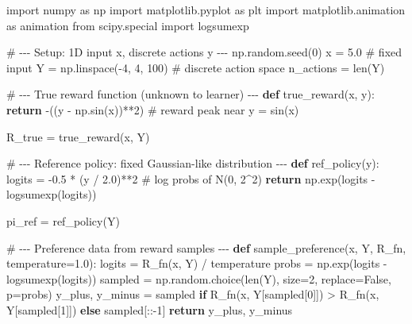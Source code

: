 \documentclass[
  letterpaper,
  numbers=noenddot,
  DIV=11]{scrreprt}
\newenvironment{Shaded}{\begin{snugshade}}{\end{snugshade}}
\newcommand{\BuiltInTok}[1]{\textcolor[rgb]{0.00,0.23,0.31}{#1}}
\newcommand{\CommentTok}[1]{\textcolor[rgb]{0.37,0.37,0.37}{#1}}
\newcommand{\ControlFlowTok}[1]{\textcolor[rgb]{0.00,0.23,0.31}{\textbf{#1}}}
\newcommand{\DecValTok}[1]{\textcolor[rgb]{0.68,0.00,0.00}{#1}}
\newcommand{\FloatTok}[1]{\textcolor[rgb]{0.68,0.00,0.00}{#1}}
\newcommand{\ImportTok}[1]{\textcolor[rgb]{0.00,0.46,0.62}{#1}}
\newcommand{\KeywordTok}[1]{\textcolor[rgb]{0.00,0.23,0.31}{\textbf{#1}}}
\newcommand{\NormalTok}[1]{\textcolor[rgb]{0.00,0.23,0.31}{#1}}
\newcommand{\OperatorTok}[1]{\textcolor[rgb]{0.37,0.37,0.37}{#1}}
\newcommand{\VariableTok}[1]{\textcolor[rgb]{0.07,0.07,0.07}{#1}}
\theoremstyle{plain}
\theoremstyle{definition}
\theoremstyle{remark}
\begin{document}
\begin{Shaded}
\begin{Highlighting}[numbers=left,,]
\ImportTok{import}\NormalTok{ numpy }\ImportTok{as}\NormalTok{ np}
\ImportTok{import}\NormalTok{ matplotlib.pyplot }\ImportTok{as}\NormalTok{ plt}
\ImportTok{import}\NormalTok{ matplotlib.animation }\ImportTok{as}\NormalTok{ animation}
\ImportTok{from}\NormalTok{ scipy.special }\ImportTok{import}\NormalTok{ logsumexp}

\CommentTok{\# {-}{-}{-} Setup: 1D input x, discrete actions y {-}{-}{-}}
\NormalTok{np.random.seed(}\DecValTok{0}\NormalTok{)}
\NormalTok{x }\OperatorTok{=} \FloatTok{5.0}  \CommentTok{\# fixed input}
\NormalTok{Y }\OperatorTok{=}\NormalTok{ np.linspace(}\OperatorTok{{-}}\DecValTok{4}\NormalTok{, }\DecValTok{4}\NormalTok{, }\DecValTok{100}\NormalTok{)  }\CommentTok{\# discrete action space}
\NormalTok{n\_actions }\OperatorTok{=} \BuiltInTok{len}\NormalTok{(Y)}

\CommentTok{\# {-}{-}{-} True reward function (unknown to learner) {-}{-}{-}}
\KeywordTok{def}\NormalTok{ true\_reward(x, y):}
    \ControlFlowTok{return} \OperatorTok{{-}}\NormalTok{((y }\OperatorTok{{-}}\NormalTok{ np.sin(x))}\OperatorTok{**}\DecValTok{2}\NormalTok{)  }\CommentTok{\# reward peak near y = sin(x)}

\NormalTok{R\_true }\OperatorTok{=}\NormalTok{ true\_reward(x, Y)}

\CommentTok{\# {-}{-}{-} Reference policy: fixed Gaussian{-}like distribution {-}{-}{-}}
\KeywordTok{def}\NormalTok{ ref\_policy(y):}
\NormalTok{    logits }\OperatorTok{=} \OperatorTok{{-}}\FloatTok{0.5} \OperatorTok{*}\NormalTok{ (y }\OperatorTok{/} \FloatTok{2.0}\NormalTok{)}\OperatorTok{**}\DecValTok{2}  \CommentTok{\# log probs of N(0, 2\^{}2)}
    \ControlFlowTok{return}\NormalTok{ np.exp(logits }\OperatorTok{{-}}\NormalTok{ logsumexp(logits))}

\NormalTok{pi\_ref }\OperatorTok{=}\NormalTok{ ref\_policy(Y)}

\CommentTok{\# {-}{-}{-} Preference data from reward samples {-}{-}{-}}
\KeywordTok{def}\NormalTok{ sample\_preference(x, Y, R\_fn, temperature}\OperatorTok{=}\FloatTok{1.0}\NormalTok{):}
\NormalTok{    logits }\OperatorTok{=}\NormalTok{ R\_fn(x, Y) }\OperatorTok{/}\NormalTok{ temperature}
\NormalTok{    probs }\OperatorTok{=}\NormalTok{ np.exp(logits }\OperatorTok{{-}}\NormalTok{ logsumexp(logits))}
\NormalTok{    sampled }\OperatorTok{=}\NormalTok{ np.random.choice(}\BuiltInTok{len}\NormalTok{(Y), size}\OperatorTok{=}\DecValTok{2}\NormalTok{, replace}\OperatorTok{=}\VariableTok{False}\NormalTok{, p}\OperatorTok{=}\NormalTok{probs)}
\NormalTok{    y\_plus, y\_minus }\OperatorTok{=}\NormalTok{ sampled }\ControlFlowTok{if}\NormalTok{ R\_fn(x, Y[sampled[}\DecValTok{0}\NormalTok{]]) }\OperatorTok{\textgreater{}}\NormalTok{ R\_fn(x, Y[sampled[}\DecValTok{1}\NormalTok{]]) }\ControlFlowTok{else}\NormalTok{ sampled[::}\OperatorTok{{-}}\DecValTok{1}\NormalTok{]}
    \ControlFlowTok{return}\NormalTok{ y\_plus, y\_minus}


\end{Highlighting}
\end{Shaded}
\end{document}
